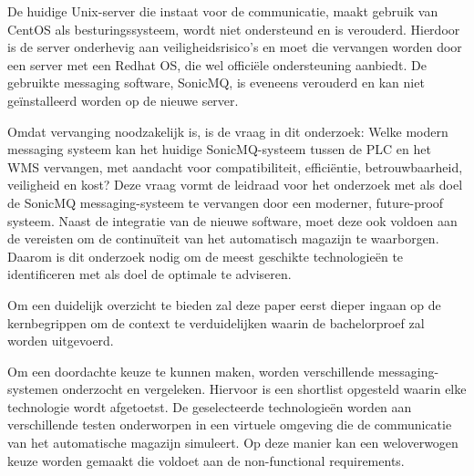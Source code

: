 De huidige Unix-server die instaat voor de communicatie, maakt gebruik van \mbox{CentOS} als besturingssysteem,
wordt niet ondersteund en is verouderd.
Hierdoor is de server onderhevig aan veiligheidsrisico's en moet die vervangen worden door een server met een Redhat OS, 
die wel officiële ondersteuning aanbiedt.
De gebruikte messaging software, SonicMQ, is eveneens verouderd en kan niet geïnstalleerd worden op de nieuwe server. 
\newline

Omdat vervanging noodzakelijk is, is de vraag in dit onderzoek: 
Welke modern messaging systeem kan het huidige SonicMQ-systeem tussen de PLC en het WMS vervangen, 
met aandacht voor compatibiliteit, efficiëntie, betrouwbaarheid, veiligheid en kost?
Deze vraag vormt de leidraad voor het onderzoek met als doel 
de SonicMQ messaging-systeem te vervangen door een moderner, future-proof systeem.
Naast de integratie van de nieuwe software, moet deze ook voldoen aan de vereisten
om de continuïteit van het automatisch magazijn te waarborgen. 
Daarom is dit onderzoek nodig om de meest geschikte technologieën te identificeren met als doel de optimale te adviseren.
\newline

Om een duidelijk overzicht te bieden zal deze paper eerst dieper ingaan op de kernbegrippen 
om de context te verduidelijken waarin de bachelorproef zal worden uitgevoerd.
\newline

Om een doordachte keuze te kunnen maken, worden verschillende messaging-systemen onderzocht en vergeleken.
Hiervoor is een shortlist opgesteld waarin elke technologie wordt afgetoetst.
De geselecteerde technologieën worden aan verschillende testen onderworpen in een virtuele omgeving die de communicatie van het automatische magazijn simuleert. 
Op deze manier kan een weloverwogen keuze worden gemaakt die voldoet aan de non-functional requirements.